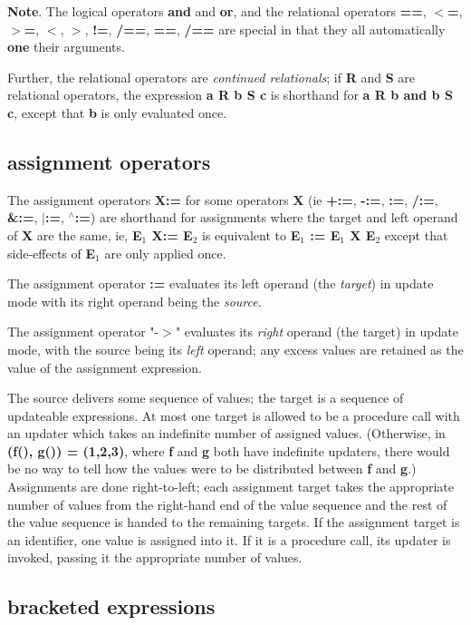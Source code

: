 \documentclass{report}
\begin{document}
{\bf Note}. The logical operators {\bf and} and {\bf or}, and the relational operators
{\bf ==}, {\bf $<$=}, {\bf $>$=}, {\bf $<$}, {\bf $>$}, {\bf !=}, {\bf /==}, {\bf ==}, {\bf /==} are special in that
they all automatically {\bf one} their arguments.

Further, the relational operators are {\em continued relationals}; if {\bf R} and {\bf S}
are relational operators, the expression {\bf a R b S c} is shorthand for {\bf a R b
and b S c}, except that {\bf b} is only evaluated once.

\subsection{assignment operators}


The assignment operators {\bf X:=} for some operators {\bf X} (ie {\bf +:=}, {\bf -:=},
{\bf *:=}, {\bf /:=}, {\bf \&:=}, {\bf $\mid$:=}, {\bf $^\wedge$:=}) are shorthand for assignments where
the target and left operand of {\bf X} are the same, ie, {\bf E$_ 1$ X:= E$_ 2$} is
equivalent to {\bf E$_ 1$ := E$_ 1$ X E$_ 2$} except that side-effects of {\bf E$_ 1$}
are only applied once.

The assignment operator {\bf :=} evaluates its left operand (the {\em target}) in
update mode with its right operand being the {\em source}.

The assignment operator "-$>$" evaluates its {\em right} operand (the target) in
update mode, with the source being its {\em left} operand; any excess values are
retained as the value of the assignment expression.

The source delivers some sequence of values; the target is a sequence of
updateable expressions. At most one target is allowed to be a procedure call
with an updater which takes an indefinite number of assigned values.
(Otherwise, in {\bf (f(), g()) = (1,2,3)}, where {\bf f} and {\bf g} both have indefinite
updaters, there would be no way to tell how the values were to be distributed
between {\bf f} and {\bf g}.) Assignments are done right-to-left; each
assignment target takes the appropriate number of values from the right-hand
end of the value sequence and the rest of the value sequence is handed to the
remaining targets. If the assignment target is an identifier, one value is
assigned into it. If it is a procedure call, its updater is invoked, passing
it the appropriate number of values.

\subsection{bracketed expressions}
\end{document}
